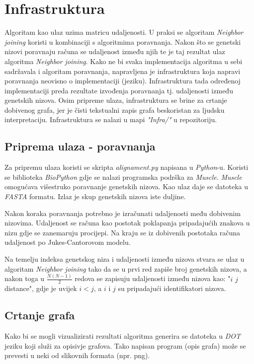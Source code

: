\documentclass[times, utf8, seminar, numeric]{fer}
\begin{document}
\section{Infrastruktura}
Algoritam kao ulaz uzima matricu udaljenosti. U praksi se algoritam \emph{Neighbor joining} koristi u kombinaciji s algoritmima poravnanja. Nakon što se genetski nizovi poravnaju računa se udaljenost između njih te je taj rezultat ulaz algoritma \emph{Neighbor joining}. Kako ne bi svaka implementacija algoritma u sebi sadržavala i algoritam poravnanja, napravljena je infrastruktura koja napravi poravnanja neovisno o implementaciji (jeziku). Infrastruktura tada određenoj implementaciji preda rezultate izvođenja poravnanja tj. udaljenosti između genetskih nizova. Osim pripreme ulaza, infrastruktura se brine za crtanje dobivenog grafa, jer je čisti tekstualni zapis grafa beskoristan za ljudsku interpretaciju. Infrastruktura se nalazi u mapi \emph{"Infra/"} u repozitoriju.

\subsection{Priprema ulaza - poravnanja}

Za pripremu ulaza koristi se skripta \emph{alignament.py} napisana u \emph{Python}-u. Koristi se biblioteka \emph{BioPython} gdje se nalazi programska podrška za \emph{Muscle}. \emph{Muscle} omogućava višestruko poravnanje genetskih nizova. Kao ulaz daje se datoteka u \emph{FASTA} formatu. Izlaz je skup genetskih nizova iste duljine.
 
Nakon koraka poravnanja potrebno je izračunati udaljenosti među dobivenim nizovima. Udaljenost se računa kao postotak poklapanja pripadajućih znakova u nizu gdje se zanemaruju procijepi. Na kraju se iz dobivenih postotaka računa udaljenost po Jukes-Cantorovom modelu.

Na temelju indeksa genetskog niza i udaljenosti između nizova stvara se ulaz u algoritam  \emph{Neighbor joining} tako da se u prvi red zapiše broj genetskih nizova, a nakon toga u $\frac{N(N-1)}{2}$ redova se zapisuju udaljenosti između nizova kao: "$i$ $j$ distance", gdje je uvijek $i<j$, a $i$ i $j$ su pripadajući identifikatori nizova.

\subsection{Crtanje grafa}

Kako bi se mogli vizualizirati rezultati algoritma generira se datoteka u \emph{DOT} jeziku koji služi za opisivje grafova. Tako napisan program (opis grafa) može se prevesti u neki od slikovnih formata (npr. png).
\end{document}

